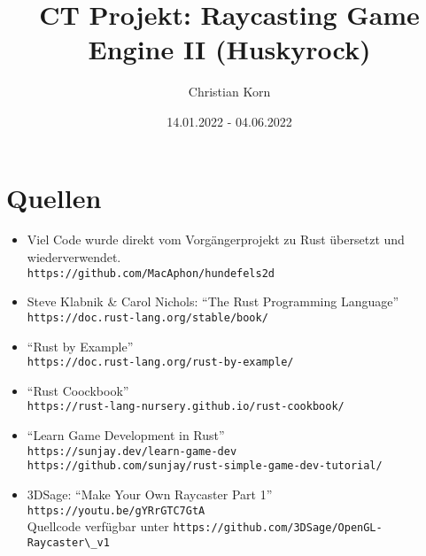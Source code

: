 \documentclass[a4paper,titlepage]{article}
\title{CT Projekt: Raycasting Game Engine II (Huskyrock)}
\author{Christian Korn}
\date{14.01.2022 - 04.06.2022}
\begin{document}
	\maketitle
	\tableofcontents
	
	\newpage
	
	\section{Quellen}
	
	\begin{itemize}
		\item Viel Code wurde direkt vom Vorgängerprojekt zu Rust übersetzt und wiederverwendet. \\
		\verb|https://github.com/MacAphon/hundefels2d|
		
		\item Steve Klabnik \& Carol Nichols: ``The Rust Programming Language'' \\
		\verb|https://doc.rust-lang.org/stable/book/|
		
		\item ``Rust by Example'' \\
		\verb|https://doc.rust-lang.org/rust-by-example/|
		
		\item ``Rust Coockbook'' \\
		\verb|https://rust-lang-nursery.github.io/rust-cookbook/|
		
		\item ``Learn Game Development in Rust'' \\
		\verb|https://sunjay.dev/learn-game-dev| \\
		\verb|https://github.com/sunjay/rust-simple-game-dev-tutorial/|
		
		\item 3DSage: ``Make Your Own Raycaster Part 1'' \\ \verb|https://youtu.be/gYRrGTC7GtA|\\ 
		Quellcode verfügbar unter \verb|https://github.com/3DSage/OpenGL-Raycaster\_v1|
	\end{itemize}
\end{document}
